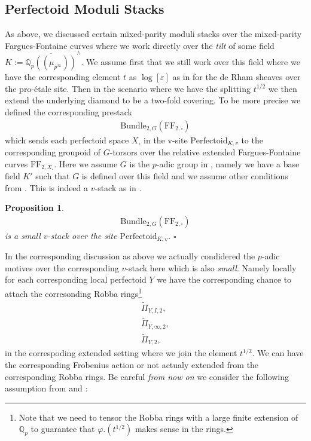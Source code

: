 \documentclass[12pt]{book}
\newtheorem{proposition}{Proposition}
\theoremstyle{definition}
\begin{document}
\subsection{Perfectoid Moduli Stacks}

\noindent As above, we discussed certain mixed-parity moduli stacks over the mixed-parity Fargues-Fontaine curves where we work directly over the \textit{tilt} of some field $K:=\overline{\mathbb{Q}_p((\mu_{p^\infty}))}^\wedge$. We assume first that we still work over this field where we have the corresponding element $t$ as $\log[\varepsilon]$ as in \cite{pHodgeS1} for the de Rham sheaves over the pro-\'etale site. Then in the scenario where we have the splitting $t^{1/2}$ we then extend the underlying diamond to be a two-fold covering. To be more precise we defined the corresponding prestack 
\begin{align}
\mathrm{Bundle}_{2,G}(\mathrm{FF}_{2,\square})
\end{align}
which sends each perfectoid space $X_\square$ in the v-site $\mathrm{Perfectoid}_{K,v}$ to the corresponding groupoid of $G$-torsors over the relative extended Fargues-Fontaine curves $\mathrm{FF}_{2,X_\square}$. Here we assume $G$ is the $p$-adic group in \cite{LPFS}, namely we have a base field $K'$ such that $G$ is defined over this field and we assume other conditions from \cite{LPFS}. This is indeed a $v$-stack as in \cite[Chapter III, Proposition 1.3]{LPFS}.


\begin{proposition}
\begin{align}
\mathrm{Bundle}_{2,G}(\mathrm{FF}_{2,\square})
\end{align}
is a small $v$-stack over the site $\mathrm{Perfectoid}_{K,v}$. $\square$
\end{proposition}

\indent In the corresponding discussion as above we actually condidered the $p$-adic motives over the corresponding $v$-stack here which is also \textit{small}. Namely locally for each corresponding local perfectoid $Y$ we have the corresponding chance to attach the corresonding Robba rings\footnote{Note that we need to tensor the Robba rings with a large finite extension of $\mathbb{Q}_p$ to guarantee that $\varphi.(t^{1/2})$ makes sense in the rings.}
\begin{align}
\widetilde{\Pi}_{Y,I,2},\\
\widetilde{\Pi}_{Y,\infty,2},\\
\widetilde{\Pi}_{Y,2},
\end{align}
in the correspoding extended setting where we join the element $t^{1/2}$. We can have the corresponding Frobenius action or not actualy extended from the corresponding Robba rings. Be careful \textit{from now on} we consider the following assumption from \cite{pHodgeKL2} and \cite{LPFS}:
\end{document}
